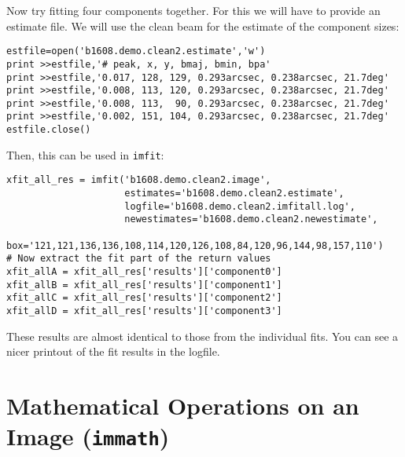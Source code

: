 
Now try fitting four components together.  For this we will have to
provide an estimate file.  We will use the clean beam for the estimate
of the component sizes:
\small
\begin{verbatim}
estfile=open('b1608.demo.clean2.estimate','w')
print >>estfile,'# peak, x, y, bmaj, bmin, bpa'
print >>estfile,'0.017, 128, 129, 0.293arcsec, 0.238arcsec, 21.7deg'
print >>estfile,'0.008, 113, 120, 0.293arcsec, 0.238arcsec, 21.7deg'
print >>estfile,'0.008, 113,  90, 0.293arcsec, 0.238arcsec, 21.7deg'
print >>estfile,'0.002, 151, 104, 0.293arcsec, 0.238arcsec, 21.7deg'
estfile.close()
\end{verbatim}
\normalsize
Then, this can be used in {\tt imfit}:
\small
\begin{verbatim}
xfit_all_res = imfit('b1608.demo.clean2.image', 
                     estimates='b1608.demo.clean2.estimate',
                     logfile='b1608.demo.clean2.imfitall.log',
                     newestimates='b1608.demo.clean2.newestimate',
                     box='121,121,136,136,108,114,120,126,108,84,120,96,144,98,157,110')
# Now extract the fit part of the return values
xfit_allA = xfit_all_res['results']['component0']
xfit_allB = xfit_all_res['results']['component1']
xfit_allC = xfit_all_res['results']['component2']
xfit_allD = xfit_all_res['results']['component3']
\end{verbatim}
\normalsize
These results are almost identical to those from the individual fits.
You can see a nicer printout of the fit results in the logfile.

\section{Mathematical Operations on an Image ({\tt immath})}
\label{section:analysis.immath}


